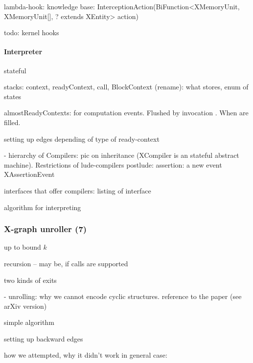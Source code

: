 lambda-hook: knowledge base: InterceptionAction(BiFunction<XMemoryUnit, XMemoryUnit[], ? extends XEntity> action)

todo: kernel hooks



\paragraph{Interpreter}
\label{ch:impl:proc:x-compiler:compilation}

stateful

stacks: context, readyContext, call, 
  BlockContext (rename): what stores, enum of states
  
almostReadyContexts: for computation events. Flushed by invocation . When are filled.

setting up edges depending of type of ready-context

- hierarchy of Compilers: pic on inheritance (XCompiler is an stateful abstract machine). Restrictions of lude-compilers
  postlude: assertion: a new event XAssertionEvent

interfaces that offer compilers: listing of interface

algorithm for interpreting



\subsubsection{X-graph unroller (7)}
\label{ch:impl:proc:x-unroll}

up to bound $k$ 

recursion -- may be, if calls are supported

two kinds of exits

- unrolling: why we cannot encode cyclic structures. reference to the paper (see arXiv version)

simple algorithm

setting up backward edges

how we attempted, why it didn't work in general case:

